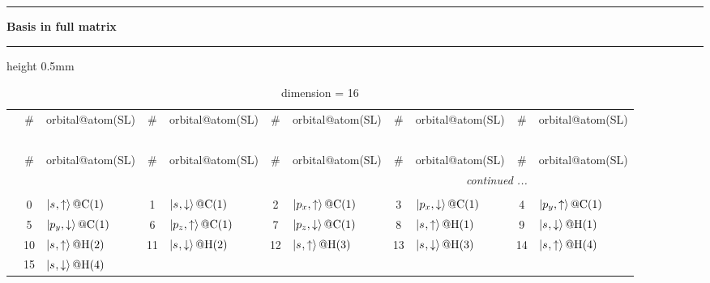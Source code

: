 \documentclass[fleqn,10pt,landscape]{jsarticle}
\begin{document}
\vspace{5mm}
\noindent \rule[0.5mm]{5mm}{0.5mm}\hspace{3mm}\textbf{Basis in full matrix}\hspace{3mm}\leaders\hrule height 0.5mm\hfill\kern0pt
\vspace{3mm}

\renewcommand{\arraystretch}{1.6}
\begin{longtable}[l]{c|cl|cl|cl|cl|cl}
\captionsetup{justification=raggedright, singlelinecheck=off}
\caption{dimension = 16}
 \\
 \hline \hline
 & \# & orbital@atom(SL) & \# & orbital@atom(SL) & \# & orbital@atom(SL) & \# & orbital@atom(SL) & \# & orbital@atom(SL) \\ \hline \endfirsthead

\multicolumn{10}{l}{\tablename\ \thetable{}} \\
 \hline \hline
 & \# & orbital@atom(SL) & \# & orbital@atom(SL) & \# & orbital@atom(SL) & \# & orbital@atom(SL) & \# & orbital@atom(SL) \\ \hline \endhead

 \hline \hline
\multicolumn{10}{r}{\footnotesize\it continued ...} \\ \endfoot

 \hline \hline
\multicolumn{10}{r}{} \\ \endlastfoot

 & 0 & $\ket{s_{},\uparrow}@{\rm C}(1)$ & 1 & $\ket{s_{},\downarrow}@{\rm C}(1)$ & 2 & $\ket{p_{x},\uparrow}@{\rm C}(1)$ & 3 & $\ket{p_{x},\downarrow}@{\rm C}(1)$ & 4 & $\ket{p_{y},\uparrow}@{\rm C}(1)$ \\
& 5 & $\ket{p_{y},\downarrow}@{\rm C}(1)$ & 6 & $\ket{p_{z},\uparrow}@{\rm C}(1)$ & 7 & $\ket{p_{z},\downarrow}@{\rm C}(1)$ & 8 & $\ket{s_{},\uparrow}@{\rm H}(1)$ & 9 & $\ket{s_{},\downarrow}@{\rm H}(1)$ \\
& 10 & $\ket{s_{},\uparrow}@{\rm H}(2)$ & 11 & $\ket{s_{},\downarrow}@{\rm H}(2)$ & 12 & $\ket{s_{},\uparrow}@{\rm H}(3)$ & 13 & $\ket{s_{},\downarrow}@{\rm H}(3)$ & 14 & $\ket{s_{},\uparrow}@{\rm H}(4)$ \\
& 15 & $\ket{s_{},\downarrow}@{\rm H}(4)$ &  &  &  &  &  &  &  &  \\
\end{longtable}
\renewcommand{\arraystretch}{1.6}
\end{document}
